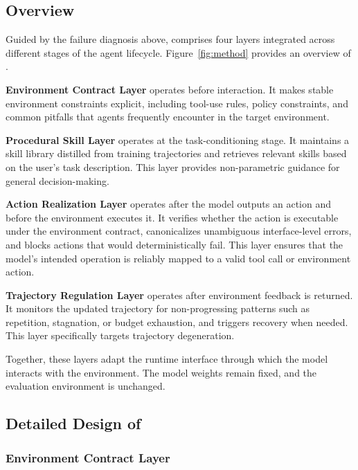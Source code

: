 \subsection{Overview}
\label{sec:method-overview}

Guided by the failure diagnosis above, \method{} comprises four layers integrated across different stages of the agent lifecycle. Figure~\ref{fig:method} provides an overview of \method{}.

 \textbf{Environment Contract Layer} operates before interaction. It makes stable environment constraints explicit, including tool-use rules, policy constraints, and common pitfalls that agents frequently encounter in the target environment.

 \textbf{Procedural Skill Layer} operates at the task-conditioning stage. It maintains a skill library distilled from training trajectories and retrieves relevant skills based on the user's task description. This layer provides non-parametric guidance for general decision-making.

 \textbf{Action Realization Layer} operates after the model outputs an action and before the environment executes it. It verifies whether the action is executable under the environment contract, canonicalizes unambiguous interface-level errors, and blocks actions that would deterministically fail. This layer ensures that the model's intended operation is reliably mapped to a valid tool call or environment action.

 \textbf{Trajectory Regulation Layer} operates after environment
feedback is returned. It monitors the updated trajectory for non-progressing patterns such as repetition, stagnation, or budget exhaustion, and triggers recovery when needed. This layer specifically targets trajectory degeneration.

Together, these layers adapt the runtime interface through which the model
interacts with the environment. The model weights remain fixed, and the
evaluation environment is unchanged.

\subsection{Detailed Design of \method}

\subsubsection{Environment Contract Layer}
\label{sec:h3}

